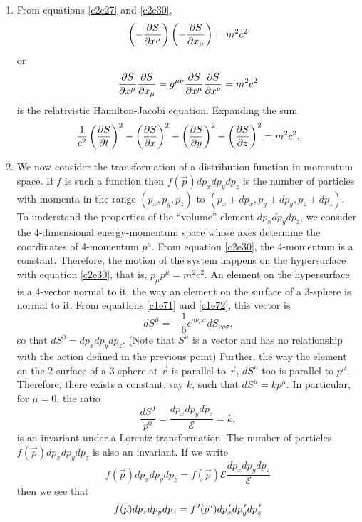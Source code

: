 \begin{enumerate}
\item From equations \eqref{c2e27} and \eqref{c2e30},
\[
\left(-\frac{\partial{S}}{\partial{x^\mu}}\right)\left(-\frac{\partial{S}}{\partial{x_\mu}}\right) = m^2c^2
\]
or
\begin{equation}\label{c2e34}
\frac{\partial{S}}{\partial{x^\mu}}\frac{\partial{S}}{\partial{x_\mu}} = g^{\mu\nu}\frac{\partial{S}}{\partial{x^\mu}}\frac{\partial{S}}{\partial{x^\nu}} = m^2c^2
\end{equation}
is the relativistic Hamilton-Jacobi equation. Expanding the sum
\begin{equation}\label{c2e35}
\frac{1}{c^2}\left(\frac{\partial{S}}{\partial{t}}\right)^2 - \left(\frac{\partial{S}}{\partial{x}}\right)^2 
- \left(\frac{\partial{S}}{\partial{y}}\right)^2 - \left(\frac{\partial{S}}{\partial{z}}\right)^2 = m^2c^2.
\end{equation}

\item We now consider the transformation of a distribution function in momentum
space. If $f$ is such a function then $f(\vec{p})dp_xdp_ydp_z$ is the number of
particles with momenta in the range $(p_x, p_y, p_z)$ to $(p_x + dp_x, p_y + 
dp_y, p_z + dp_z)$. To understand the properties of the ``volume'' element 
$dp_xdp_ydp_z$, we consider the 4-dimensional energy-momentum space whose axes 
determine the coordinates of 4-momentum $p^\mu$. From equation \eqref{c2e30}, 
the 4-momentum is a constant. Therefore, the motion of the system happens on 
the hypersurface with equation \eqref{c2e30}, that is, $p_\mu p^\mu = m^2c^2$. 
An element on the hypersurface is a 4-vector normal to it, the way an element 
on the surface of a 3-sphere is normal to it. From equations \eqref{c1e71} 
and \eqref{c1e72}, this vector is
\begin{equation}\label{c2e36}
dS^\mu = -\frac{1}{6}\epsilon^{\mu\nu\rho\sigma}dS_{\nu\rho\sigma}.
\end{equation}
so that $dS^0 = dp_xdp_ydp_z$. (Note that $S^\mu$ is a vector and has no
relationship with the action defined in the previous point) Further, the way 
the element on the 2-surface of a 3-sphere at $\vec{r}$ is parallel to 
$\vec{r}$, $dS^\mu$ too is parallel to $p^\mu$. Therefore, there exists a 
constant, say $k$, such that $dS^\mu = kp^\mu$. In particular, for $\mu = 0$, 
the ratio
\begin{equation}\label{c2e37}
\frac{dS^0}{p^0} = \frac{dp_xdp_ydp_z}{\mathcal{E}} = k,
\end{equation}
is an invariant under a Lorentz transformation. The number of particles 
$f(\vec{p}) dp_xdp_ydp_z$ is also an invariant. If we write
\[
f(\vec{p})dp_xdp_ydp_z = f(\vec{p})\mathcal{E}\frac{dp_xdp_ydp_z}{\mathcal{E}}
\]
then we see that
\[
f(\vec{p})dp_xdp_ydp_z = f^{\,\prime}(\vec{p}^{\,\prime})dp_x^{\,\prime} dp_y^{\,\prime} dp_z^{\,\prime}
\]
\end{enumerate}
